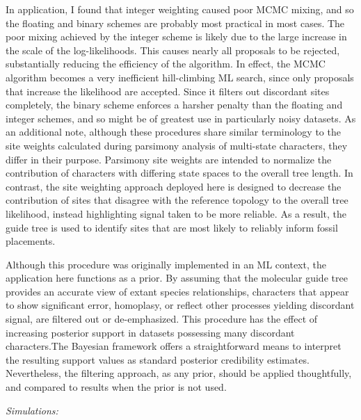 \documentclass[12pt]{article}
\begin{document}
In application, I found that integer weighting caused poor MCMC mixing,
and so the floating and binary schemes are probably most practical in
most cases. The poor mixing achieved by the integer scheme is likely due to the large increase in the scale of the log-likelihoods. 
This causes nearly all proposals to be rejected, substantially reducing the efficiency of the algorithm. In effect,
the MCMC algorithm becomes a very inefficient hill-climbing ML search, since only proposals that increase the likelihood are accepted.
 Since it filters out discordant sites completely, the binary
scheme enforces a harsher penalty than the floating and integer
schemes, and so might be of greatest use in particularly noisy datasets.
As an additional note, although these procedures share similar
terminology to the site weights calculated during parsimony analysis of
multi-state characters, they differ in their purpose. Parsimony site
weights are intended to normalize the contribution of characters with
differing state spaces to the overall tree length. In contrast, the site
weighting approach deployed here is designed to decrease the
contribution of sites that disagree with the reference topology to the
overall tree likelihood, instead highlighting signal taken to be
more reliable. As a result, the guide tree is used to identify sites
that are most likely to reliably inform fossil placements.

Although this procedure was originally implemented in an ML context, the application here 
functions  as a prior. By assuming that the molecular guide tree provides an accurate view of 
extant species relationships, characters that appear to show significant error, homoplasy, or 
reflect other processes yielding discordant signal, are filtered out or de-emphasized. This 
procedure has the effect of increasing posterior support in datasets possessing many discordant
characters.The Bayesian framework offers a straightforward means to interpret the resulting 
support values as standard posterior credibility estimates. Nevertheless, the filtering approach,
as any prior, should be applied thoughtfully, and compared to results when the prior is not used.

\noindent\emph{Simulations:}
\end{document}
